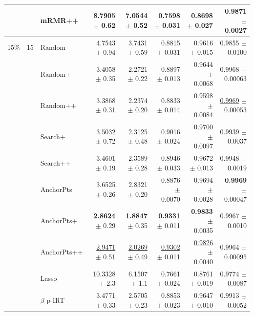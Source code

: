 \begin{longtable}{llp{}rrrrr}
 &  & mRMR++ & 8.7905 {\scriptsize $\pm$ 0.62} & 7.0544 {\scriptsize $\pm$ 0.52} & 0.7598 {\scriptsize $\pm$ 0.031} & 0.8698 {\scriptsize $\pm$ 0.027} & 0.9871 {\scriptsize $\pm$ 0.0027} \\
\midrule
15\% & 15 & Random & 4.7543 {\scriptsize $\pm$ 0.94} & 3.7431 {\scriptsize $\pm$ 0.59} & 0.8815 {\scriptsize $\pm$ 0.031} & 0.9616 {\scriptsize $\pm$ 0.015} & 0.9855 {\scriptsize $\pm$ 0.0100} \\
 &  & Random+ & 3.4058 {\scriptsize $\pm$ 0.35} & 2.2721 {\scriptsize $\pm$ 0.22} & 0.8897 {\scriptsize $\pm$ 0.013} & 0.9644 {\scriptsize $\pm$ 0.0068} & 0.9968 {\scriptsize $\pm$ 0.00063} \\
 &  & Random++ & 3.3868 {\scriptsize $\pm$ 0.31} & 2.2374 {\scriptsize $\pm$ 0.20} & 0.8833 {\scriptsize $\pm$ 0.014} & 0.9598 {\scriptsize $\pm$ 0.0084} & \underline{0.9969} {\scriptsize $\pm$ 0.00053} \\
 &  & Search+ & 3.5032 {\scriptsize $\pm$ 0.72} & 2.3125 {\scriptsize $\pm$ 0.48} & 0.9016 {\scriptsize $\pm$ 0.024} & 0.9700 {\scriptsize $\pm$ 0.0097} & 0.9939 {\scriptsize $\pm$ 0.0037} \\
 &  & Search++ & 3.4601 {\scriptsize $\pm$ 0.19} & 2.3589 {\scriptsize $\pm$ 0.28} & 0.8946 {\scriptsize $\pm$ 0.033} & 0.9672 {\scriptsize $\pm$ 0.013} & 0.9948 {\scriptsize $\pm$ 0.0019} \\
 &  & AnchorPts & 3.6525 {\scriptsize $\pm$ 0.26} & 2.8321 {\scriptsize $\pm$ 0.20} & 0.8876 {\scriptsize $\pm$ 0.0070} & 0.9694 {\scriptsize $\pm$ 0.0028} & \textbf{0.9969} {\scriptsize $\pm$ 0.00047} \\
 &  & AnchorPts+ & \textbf{2.8624} {\scriptsize $\pm$ 0.29} & \textbf{1.8847} {\scriptsize $\pm$ 0.35} & \textbf{0.9331} {\scriptsize $\pm$ 0.011} & \textbf{0.9833} {\scriptsize $\pm$ 0.0035} & 0.9967 {\scriptsize $\pm$ 0.0010} \\
 &  & AnchorPts++ & \underline{2.9471} {\scriptsize $\pm$ 0.51} & \underline{2.0269} {\scriptsize $\pm$ 0.49} & \underline{0.9302} {\scriptsize $\pm$ 0.011} & \underline{0.9826} {\scriptsize $\pm$ 0.0040} & 0.9964 {\scriptsize $\pm$ 0.00095} \\
 &  & Lasso & 10.3328 {\scriptsize $\pm$ 2.3} & 6.1507 {\scriptsize $\pm$ 1.1} & 0.7661 {\scriptsize $\pm$ 0.024} & 0.8761 {\scriptsize $\pm$ 0.019} & 0.9774 {\scriptsize $\pm$ 0.0087} \\
 &  & $\beta$ p-IRT & 3.4771 {\scriptsize $\pm$ 0.33} & 2.5705 {\scriptsize $\pm$ 0.23} & 0.8853 {\scriptsize $\pm$ 0.023} & 0.9647 {\scriptsize $\pm$ 0.010} & 0.9913 {\scriptsize $\pm$ 0.0052} \\

\end{longtable}
